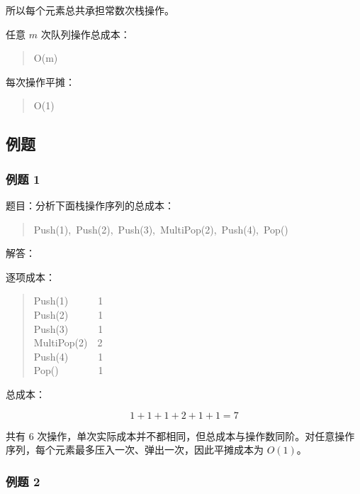 \documentclass[UTF8,zihao=-4]{ctexart}
\begin{document}
所以每个元素总共承担常数次栈操作。

任意 $m$ 次队列操作总成本：

\begin{quote}
\small\ttfamily\raggedright
\relax O(m)\\
\end{quote}

每次操作平摊：

\begin{quote}
\small\ttfamily\raggedright
\relax O(1)\\
\end{quote}

\subsection*{例题}

\subsubsection*{例题 1}

题目：分析下面栈操作序列的总成本：

\begin{quote}
\small\ttfamily\raggedright
\relax Push(1),\ Push(2),\ Push(3),\ MultiPop(2),\ Push(4),\ Pop()\\
\end{quote}

解答：

逐项成本：

\begin{quote}
\small\ttfamily\raggedright
\relax Push(1)\ \ \ \ \ \ 1\\
\relax Push(2)\ \ \ \ \ \ 1\\
\relax Push(3)\ \ \ \ \ \ 1\\
\relax MultiPop(2)\ \ 2\\
\relax Push(4)\ \ \ \ \ \ 1\\
\relax Pop()\ \ \ \ \ \ \ \ 1\\
\end{quote}

总成本：

\[1 + 1 + 1 + 2 + 1 + 1 = 7\]

共有 6 次操作，单次实际成本并不都相同，但总成本与操作数同阶。对任意操作序列，每个元素最多压入一次、弹出一次，因此平摊成本为 $O(1)$。

\subsubsection*{例题 2}
\end{document}
